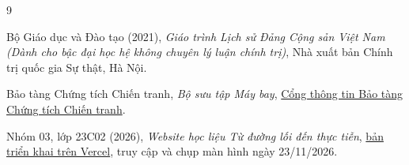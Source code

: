 \begin{thebibliography}{9}
 Bộ Giáo dục và Đào tạo (2021), \emph{Giáo trình Lịch sử Đảng Cộng sản Việt Nam (Dành cho bậc đại học hệ không chuyên lý luận chính trị)}, Nhà xuất bản Chính trị quốc gia Sự thật, Hà Nội.

 Bảo tàng Chứng tích Chiến tranh, \emph{Bộ sưu tập Máy bay}, \href{https://baotangchungtichchientranh.vn/kham-pha/bo-suu-tap/may-bay}{Cổng thông tin Bảo tàng Chứng tích Chiến tranh}.

 Nhóm 03, lớp 23C02 (2026), \emph{Website học liệu Từ đường lối đến thực tiễn}, \href{https://nhom03-lsd-23c02.vercel.app/}{bản triển khai trên Vercel}, truy cập và chụp màn hình ngày 23/11/2026.
\end{thebibliography}
